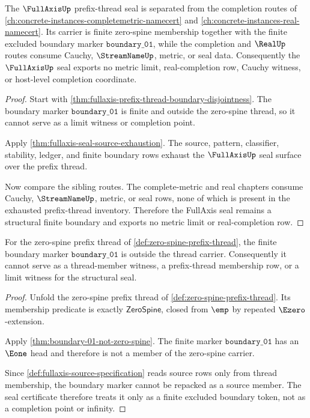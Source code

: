 \begin{theorem}
\label{thm:fullaxis-completion-sibling-separation}
The $\FullAxisUp$ prefix-thread seal is separated from the completion routes of \autoref{ch:concrete-instances-completemetric-namecert} and \autoref{ch:concrete-instances-real-namecert}. Its carrier is finite zero-spine membership together with the finite excluded boundary marker $\mathtt{boundary\_01}$, while the completion and $\RealUp$ routes consume Cauchy, $\StreamNameUp$, metric, or seal data. Consequently the $\FullAxisUp$ seal exports no metric limit, real-completion row, Cauchy witness, or host-level completion coordinate.
\end{theorem}
\begin{proof}
Start with \autoref{thm:fullaxis-prefix-thread-boundary-disjointness}. The boundary marker $\mathtt{boundary\_01}$ is finite and outside the zero-spine thread, so it cannot serve as a limit witness or completion point.

Apply \autoref{thm:fullaxis-seal-source-exhaustion}. The source, pattern, classifier, stability, ledger, and finite boundary rows exhaust the $\FullAxisUp$ seal surface over the prefix thread.

Now compare the sibling routes. The complete-metric and real chapters consume Cauchy, $\StreamNameUp$, metric, or seal rows, none of which is present in the exhausted prefix-thread inventory. Therefore the FullAxis seal remains a structural finite boundary and exports no metric limit or real-completion row.
\end{proof}

\begin{theorem}
\label{thm:fullaxis-prefix-thread-boundary-disjointness}
For the zero-spine prefix thread of \autoref{def:zero-spine-prefix-thread}, the
finite boundary marker $\mathtt{boundary\_01}$ is outside the thread carrier.
Consequently it cannot serve as a thread-member witness, a prefix-thread
membership row, or a limit witness for the structural seal.
\end{theorem}
\begin{proof}
Unfold the zero-spine prefix thread of \autoref{def:zero-spine-prefix-thread}.
Its membership predicate is exactly $\mathsf{ZeroSpine}$, closed from $\emp$ by
repeated $\Ezero$-extension.

Apply \autoref{thm:boundary-01-not-zero-spine}. The finite marker
$\mathtt{boundary\_01}$ has an $\Eone$ head and therefore is not a member of the
zero-spine carrier.

Since \autoref{def:fullaxis-source-specification} reads source rows only from
thread membership, the boundary marker cannot be repacked as a source member.
The seal certificate therefore treats it only as a finite excluded boundary
token, not as a completion point or infinity.
\end{proof}

